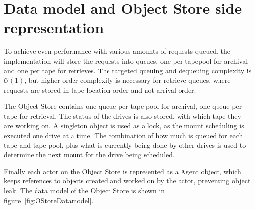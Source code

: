 \section{Data model and Object Store side representation}

To achieve even performance with various amounts of requests queued, the implementation will store the requests into
queues, one per \gls{tapepool} for archival and one per tape for retrieves.  The targeted queuing and dequeuing complexity
is $\mathcal{O}(1)$, but higher order complexity is necessary for retrieve queues, where requests are stored in tape
location order and not arrival order.

The Object Store contains one queue per tape pool for archival, one queue per tape for retrieval. The status of the
drives is also stored, with which tape they are working on. A singleton object is used as a lock, as the mount scheduling
is executed one drive at a time. The combination of how much is queued for each tape and tape pool, plus what is
currently being done by other drives is used to determine the next mount for the drive being scheduled.

Finally each actor on the Object Store is represented as a Agent object, which keeps references to objects created and
worked on by the actor, preventing object leak. The data model of the Object Store is shown in
figure~\ref{fig:OStoreDatamodel}.


